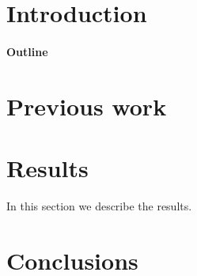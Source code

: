 \documentclass[12pt]{article}
\begin{document}
\maketitle

\begin{abstract}
 \ldots
\end{abstract}

\section{Introduction}


\paragraph{Outline}


\section{Previous work}\label{previous work}


\section{Results}\label{results}
In this section we describe the results.

\section{Conclusions}\label{conclusions}




\end{document}
